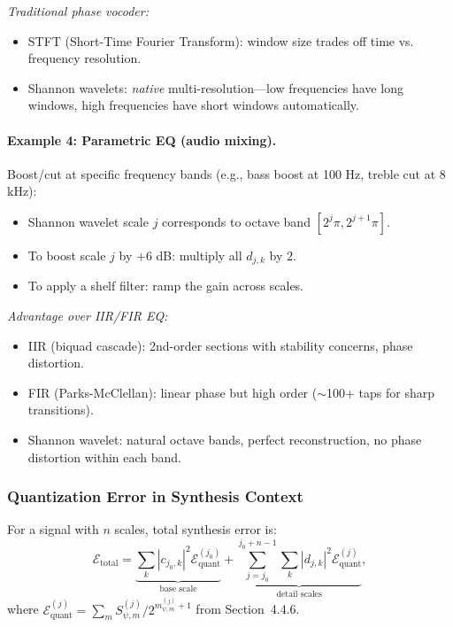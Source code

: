 \emph{Traditional phase vocoder:}
\begin{itemize}
\item STFT (Short-Time Fourier Transform): window size trades off time vs. frequency resolution.
\item Shannon wavelets: \emph{native} multi-resolution—low frequencies have long windows, high frequencies have short windows automatically.
\end{itemize}

\paragraph{Example 4: Parametric EQ (audio mixing).}
Boost/cut at specific frequency bands (e.g., bass boost at 100 Hz, treble cut at 8 kHz):
\begin{itemize}
\item Shannon wavelet scale $j$ corresponds to octave band $[2^j\pi, 2^{j+1}\pi]$.
\item To boost scale $j$ by $+6$ dB: multiply all $d_{j,k}$ by $2$.
\item To apply a shelf filter: ramp the gain across scales.
\end{itemize}

\emph{Advantage over IIR/FIR EQ:}
\begin{itemize}
\item IIR (biquad cascade): 2nd-order sections with stability concerns, phase distortion.
\item FIR (Parks-McClellan): linear phase but high order ($\sim$100+ taps for sharp transitions).
\item Shannon wavelet: natural octave bands, perfect reconstruction, no phase distortion within each band.
\end{itemize}

\subsubsection{Quantization Error in Synthesis Context}

For a signal with $n$ scales, total synthesis error is:
\[
\mathcal{E}_{\text{total}} = \underbrace{\sum_{k} |c_{j_0,k}|^2 \mathcal{E}_{\text{quant}}^{(j_0)}}_{\text{base scale}} + \underbrace{\sum_{j=j_0}^{j_0+n-1} \sum_{k} |d_{j,k}|^2 \mathcal{E}_{\text{quant}}^{(j)}}_{\text{detail scales}},
\]
where $\mathcal{E}_{\text{quant}}^{(j)} = \sum_{m} S_{\psi,m}^{(j)} / 2^{m_{\psi,m}^{(j)}+1}$ from Section~4.4.6.


